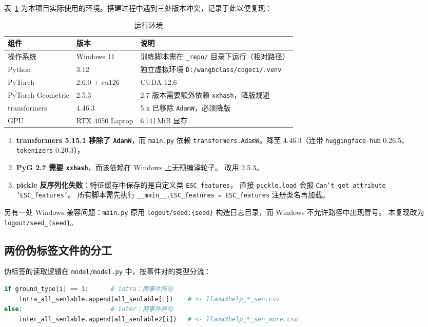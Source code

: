 表~\ref{tab:env} 为本项目实际使用的环境。搭建过程中遇到三处版本冲突，记录于此以便复现：

\begin{table}[H]
\centering
\caption{运行环境}
\label{tab:env}
\small
\begin{tabular}{lll}
\toprule
组件 & 版本 & 说明\\
\midrule
操作系统 & Windows 11 & 训练脚本需在 \texttt{\_repo/} 目录下运行（相对路径）\\
Python & 3.12 & 独立虚拟环境 \texttt{D:/wangbclass/cogeci/.venv}\\
PyTorch & 2.6.0 + cu126 & CUDA 12.6\\
PyTorch Geometric & 2.5.3 & 2.7 版本需要额外依赖 \texttt{xxhash}，降版规避\\
transformers & 4.46.3 & 5.x 已移除 \texttt{AdamW}，必须降版\\
GPU & RTX 4050 Laptop & 6\,141\,MiB 显存\\
\bottomrule
\end{tabular}
\end{table}

\begin{enumerate}
  \item \textbf{transformers 5.15.1 移除了 \texttt{AdamW}}，而 \texttt{main.py} 依赖
        \texttt{transformers.AdamW}。降至 4.46.3（连带 \texttt{huggingface-hub} 0.26.5、
        \texttt{tokenizers} 0.20.3）。
  \item \textbf{PyG 2.7 需要 \texttt{xxhash}}，而该依赖在 Windows 上无预编译轮子。
        改用 2.5.3。
  \item \textbf{pickle 反序列化失败}：特征缓存中保存的是自定义类 \texttt{ESC\_features}，
        直接 \texttt{pickle.load} 会报 \texttt{Can't get attribute 'ESC\_features'}。
        所有脚本需先执行 \texttt{\_\_main\_\_.ESC\_features = ESC\_features} 注册类名再加载。
\end{enumerate}

另有一处 Windows 兼容问题：\texttt{main.py} 原用
\texttt{logout/seed:\{seed\}} 构造日志目录，而 Windows 不允许路径中出现冒号。
本复现改为 \texttt{logout/seed\_\{seed\}}。

\subsection{两份伪标签文件的分工}

伪标签的读取逻辑在 \texttt{model/model.py} 中，按事件对的类型分流：
\begin{lstlisting}[language=Python]
if ground_type[i] == 1:      # intra：两事件同句
    intra_all_senlable.append(all_senlable[i])    # <- llama3help_*_sen.csv
else:                        # inter：两事件异句
    inter_all_senlable.append(all_senlable2[i])   # <- llama3help_*_sen_more.csv
\end{lstlisting}

